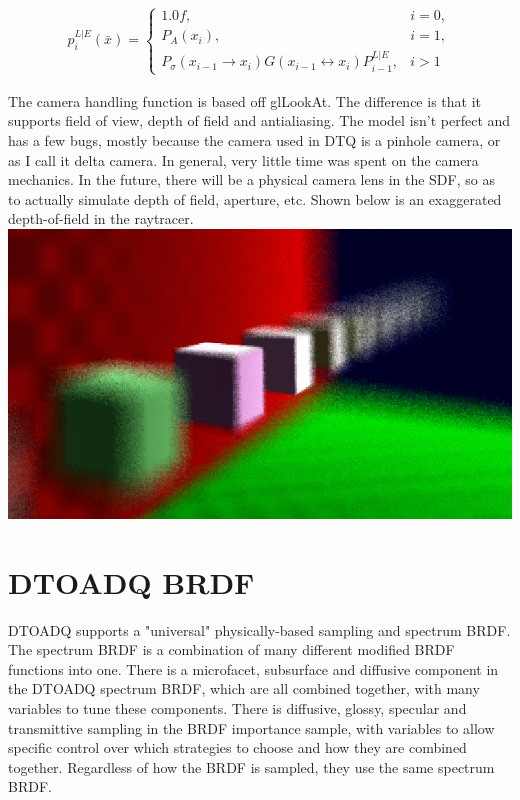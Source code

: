 \documentclass{article}
\begin{document}
  \begin{align}
    p^{L|E}_i(\bar{x}) =
    \begin{cases}
      1.0f, & i = 0,\\
      P_A(x_i), & i = 1,\\
      P_{\sigma}(x_{i-1} \rightarrow x_i) G(x_{i-1} \leftrightarrow x_i)
      P^{L|E}_{i-1}, & i > 1
    \end{cases}
  \end{align}



  The camera handling function is based off glLookAt. The difference is that it
  supports field of view, depth of field and antialiasing. The model isn't
perfect and has a few bugs, mostly because the camera used in DTQ
is a pinhole camera, or as I call it delta camera. In general, very little time
was spent on the camera mechanics. In the future, there will be a physical
camera lens in the SDF, so as to actually simulate depth of field, aperture,
etc. Shown below is an exaggerated depth-of-field in the raytracer.
\\


  \includegraphics[scale=0.5]{rt_dof}

  \section{DTOADQ BRDF}
  DTOADQ supports a "universal" physically-based sampling and spectrum BRDF. The
spectrum BRDF is a combination of many different modified BRDF functions into
one. There is a microfacet, subsurface and diffusive component in the DTOADQ
spectrum BRDF, which are all combined together, with many variables to tune
these components. There is diffusive, glossy, specular and transmittive sampling
in the BRDF importance sample, with variables to allow specific control over
which strategies to choose and how they are combined together. Regardless of how
the BRDF is sampled, they use the same spectrum BRDF.
  
\end{document}
